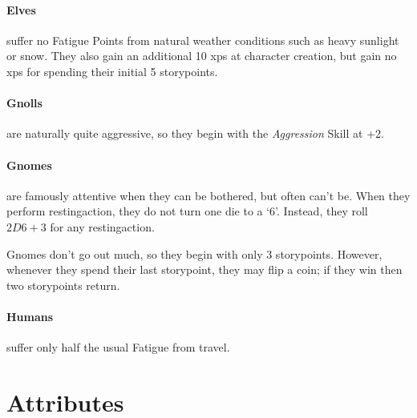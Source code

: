 \begin{multicols}{2}
{\paragraph{Elves}
suffer no Fatigue Points from natural weather conditions such as heavy sunlight or snow.
They also gain an additional 10 \glspl{xp} at character creation, but gain no \glspl{xp} for spending their initial 5 \glspl{storypoint}.

\paragraph{Gnolls}
are naturally quite aggressive, so they begin with the \textit{Aggression} Skill at +2.

\paragraph{Gnomes}
are famously attentive when they can be bothered, but often can't be.
When they perform \gls{restingaction}, they do not turn one die to a `6'.
Instead, they roll $2D6+3$ for any \gls{restingaction}.

Gnomes don't go out much, so they begin with only 3 \glspl{storypoint}.
However, whenever they spend their last \gls{storypoint}, they may flip a coin; if they win then two \glspl{storypoint} return.

\paragraph{Humans}
suffer only half the usual Fatigue from travel.
}

\end{multicols}

\section{Attributes}

